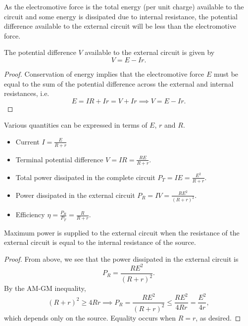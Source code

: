 As the electromotive force is the total energy (per unit charge) available to the circuit and some energy is dissipated due to internal resistance, the potential difference available to the external circuit will be less than the electromotive force.

\begin{proposition}
    The potential difference $V$ available to the external circuit is given by \[V = E - Ir.\]
\end{proposition}
\begin{proof}
    Conservation of energy implies that the electromotive force $E$ must be equal to the sum of the potential difference across the external and internal resistances, i.e. \[E = IR + Ir = V + Ir \implies V = E - Ir.\]
\end{proof}

Various quantities can be expressed in terms of $E$, $r$ and $R$.

\begin{proposition}
    \phantom{.}
    \begin{itemize}
        \item Current $\displaystyle I = \frac{E}{R + r}$
        \item Terminal potential difference $\displaystyle V = IR = \frac{RE}{R+r}$.
        \item Total power dissipated in the complete circuit $\displaystyle P_T = IE = \frac{E^2}{R+r}$.
        \item Power dissipated in the external circuit $\displaystyle P_R = IV = \frac{R E^2}{(R+r)^2}$.
        \item Efficiency $\displaystyle \eta = \frac{P_R}{P_T} = \frac{R}{R+r}$.
    \end{itemize}
\end{proposition}

\begin{theorem}
    Maximum power is supplied to the external circuit when the resistance of the external circuit is equal to the internal resistance of the source.
\end{theorem}
\begin{proof}
    From above, we see that the power dissipated in the external circuit is \[P_R = \frac{R E^2}{(R+r)^2}.\] By the AM-GM inequality, \[(R+r)^2 \geq 4Rr \implies P_R = \frac{RE^2}{(R+r)^2} \leq \frac{RE^2}{4Rr} = \frac{E^2}{4r},\] which depends only on the source. Equality occurs when $R = r$, as desired.
\end{proof}
